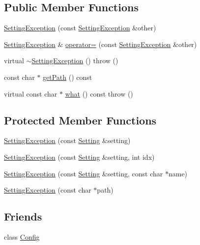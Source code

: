 \subsection*{Public Member Functions}
\begin{DoxyCompactItemize}
\item 
\hyperlink{classlibconfig_1_1_setting_exception_a22ad32bab261aa1a6a17e4e1783240e4}{SettingException} (const \hyperlink{classlibconfig_1_1_setting_exception}{SettingException} \&other)
\item 
\hyperlink{classlibconfig_1_1_setting_exception}{SettingException} \& \hyperlink{classlibconfig_1_1_setting_exception_aec6caeb252c238bde272e5050c6b881f}{operator=} (const \hyperlink{classlibconfig_1_1_setting_exception}{SettingException} \&other)
\item 
virtual \hyperlink{classlibconfig_1_1_setting_exception_a430c62b735c729be8b1478dae91b59cd}{$\sim$SettingException} ()  throw ()
\item 
const char $\ast$ \hyperlink{classlibconfig_1_1_setting_exception_a3aa229dde3459dbd18d9598f8d1bede4}{getPath} () const 
\item 
virtual const char $\ast$ \hyperlink{classlibconfig_1_1_setting_exception_aead416e6b1f46683804fff8f4649df05}{what} () const   throw ()
\end{DoxyCompactItemize}
\subsection*{Protected Member Functions}
\begin{DoxyCompactItemize}
\item 
\hyperlink{classlibconfig_1_1_setting_exception_a8e64e378f22317a3daa5824071c38e89}{SettingException} (const \hyperlink{classlibconfig_1_1_setting}{Setting} \&setting)
\item 
\hyperlink{classlibconfig_1_1_setting_exception_a6ed0f32d95fe0730c8a10b2a12a12d7a}{SettingException} (const \hyperlink{classlibconfig_1_1_setting}{Setting} \&setting, int idx)
\item 
\hyperlink{classlibconfig_1_1_setting_exception_adfd98e2d09b2689884b9349968ea3477}{SettingException} (const \hyperlink{classlibconfig_1_1_setting}{Setting} \&setting, const char $\ast$name)
\item 
\hyperlink{classlibconfig_1_1_setting_exception_a9e695af9dc4098bed2091f2753b79cf1}{SettingException} (const char $\ast$path)
\end{DoxyCompactItemize}
\subsection*{Friends}
\begin{DoxyCompactItemize}
\item 
class \hyperlink{classlibconfig_1_1_setting_exception_ac3da7e21a05bf8852638db7e4dd1b81a}{Config}
\end{DoxyCompactItemize}


